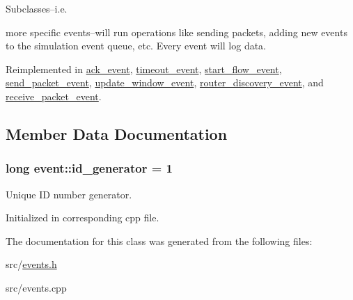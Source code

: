 Subclasses--i.\-e. 

more specific events--will run operations like sending packets, adding new events to the simulation event queue, etc. Every event will log data. 

Reimplemented in \hyperlink{classack__event_a7c56c7da987f6092c855d27a114e9b33}{ack\-\_\-event}, \hyperlink{classtimeout__event_abacd620618ef70149548ca014fa7fd57}{timeout\-\_\-event}, \hyperlink{classstart__flow__event_a91f8f55565468bc294d89ccba846f759}{start\-\_\-flow\-\_\-event}, \hyperlink{classsend__packet__event_a844d3bf4a98011f4d128d05a8fb1a2db}{send\-\_\-packet\-\_\-event}, \hyperlink{classupdate__window__event_a41d9c1b343cd0ddceef94de6bc4abb68}{update\-\_\-window\-\_\-event}, \hyperlink{classrouter__discovery__event_a170768272244ac6578a7c38ffd82733f}{router\-\_\-discovery\-\_\-event}, and \hyperlink{classreceive__packet__event_ae7c0b0f1defa3e225373bea73f98b2ba}{receive\-\_\-packet\-\_\-event}.



\subsection{Member Data Documentation}
\hypertarget{classevent_acdf8529e2178b7f7604beee6d8d459c3}{
\subsubsection[{id\-\_\-generator}]{\setlength{\rightskip}{0pt plus 5cm}long event\-::id\-\_\-generator = 1\hspace{0.3cm}{\ttfamily [static]}}}\label{classevent_acdf8529e2178b7f7604beee6d8d459c3}


Unique I\-D number generator. 

Initialized in corresponding cpp file. 

The documentation for this class was generated from the following files\-:\begin{DoxyCompactItemize}
\item 
src/\hyperlink{events_8h}{events.\-h}\item 
src/events.\-cpp\end{DoxyCompactItemize}
